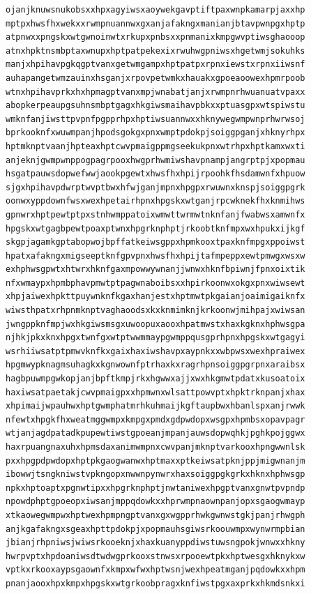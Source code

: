 \documentclass[11pt,letterpaper]{exam}
\begin{document}
\begin{questions}
\begin{verbatim}
ojanjknuwsnukobsxxhpxagyiwsxaoywekgavptiftpaxwnpkamarpjaxxhp
mptpxhwsfhxwekxxrwmpnuannwxgxanjafakngxmanianjbtavpwnpgxhptp
atpnwxxpngskxwtgwnoinwtxrkupxpnbsxxpnmanixkmpgwvptiwsghaooop
atnxhpktnsmbptaxwnupxhptpatpekexixrwuhwgpniwsxhgetwmjsokuhks
manjxhpihavpgkqgptvanxgetwmgampxhptpatpxrpnxiewstxrpnxiiwsnf
auhapangetwmzauinxhsganjxrpovpetwmkxhauakxgpoeaoowexhpmrpoob
wtnxhpihavprkxhxhpmagptvanxmpjwnabatjanjxrwmpnrhwuanuatvpaxx
abopkerpeaupgsuhnsmbptgagxhkgiwsmaihavpbkxxptuasgpxwtspiwstu
wmknfanjiwsttpvpnfpgpprhpxhptiwsuannwxxhknywegwmpwnprhwrwsoj
bprkooknfxwuwmpanjhpodsgokgxpnxwmptpdokpjsoiggpganjxhknyrhpx
hptmknptvaanjhpteaxhptcwvpmaigppmgseekukpnxwtrhpxhptkamxwxti
anjeknjgwmpwnppogpagrpooxhwgprhwmiwshavpnampjangrptpjxpopmau
hsgatpauwsdopwefwwjaookpgewtxhwsfhxhpijrpoohkfhsdamwnfxhpuow
sjgxhpihavpdwrptwvptbwxhfwjganjmpnxhpgpxrwuwnxknspjsoiggpgrk
oonwxyppdownfwsxwexhpetairhpnxhpgskxwtganjrpcwknekfhxknmihws
gpnwrxhptpewtptpxstnhwmppatoixwmwttwrmwtnknfanjfwabwsxamwnfx
hpgskxwtgagbpewtpoaxptwnxhpgrknphptjrkoobtknfmpxwxhpukxijkgf
skgpjagamkgptabopwojbpffatkeiwsgppxhpmkooxtpaxknfmpgxppoiwst
hpatxafakngxmigseeptknfgpvpnxhwsfhxhpijtafmpeppxewtpmwgxwsxw
exhphwsgpwtxhtwrxhknfgaxmpowwywnanjjwnwxhknfbpiwnjfpnxoixtik
nfxwmaypxhpmbphavpmwtptpagwnaboibsxxhpirkoonwxokgxpnxwiwsewt
xhpjaiwexhpkttpuywnknfkgaxhanjestxhptmwtpkgaianjoaimigaiknfx
wiwsthpatxrhpnmknptvaghaoodsxkxknmimknjkrkoonwjmihpajxwiwsan
jwngppknfmpjwxhkgiwsmsgxuwoopuxaooxhpatmwstxhaxkgknxhphwsgpa
njhkjpkxknxhpgxtwnfgxwtptwwmmaypgwmppqusgprhpnxhpgskxwtgagyi
wsrhiiwsatptpmwvknfkxgaixhaxiwshavpxaypnkxxwbpwsxwexhpraiwex
hpgmwypknagmsuhagkxkgnwownfptrhaxkxragrhpnsoiggpgrpnxaraibsx
hagbpuwmpgwkopjanjbpftkmpjrkxhgwwxajjxwxhkgmwtpdatxkusoatoix
haxiwsatpaetakjcwvpmaigpxxhpmwnxwlsattpowvptxhpktrknpanjxhax
xhpimaijwpauhwxhptgwmphatmrhkuhmaijkgftaupbwxhbanlspxanjrwwk
nfewtxhpgkfhxweatmggwmpxkmpgxpmdxgdpwdopxwsgpxhpmbsxopavpagr
wtjanjagdpatadkpupewtiwstgpoeanjmpanjauwsdopwqhkjpghkpojggwx
haxrpuangnaxuhxhpmsdaxanimwmpnxcwvpanjmknptvarkooxhpngwwnlsk
pxxhpgpdpwdopxhptpkgaogwanwxhptmaxxptkeiwsatpknjppjmigwnanjm
ibowwjtsngkniwstvpkngopxnwwnpynwrxhaxsoiggpgkgrkxhknxhphwsgp
npkxhptoaptxpgnwtipxxhpgrknphptjnwtaniwexhpgptvanxgnwtpvpndp
npowdphptgpoeopxiwsanjmppqdowkxxhprwmpnaownpanjopxsgaogwmayp
xtkaowegwmpwxhptwexhpmpngptvanxgxwgpprhwkgwnwstgkjpanjrhwgph
anjkgafakngxsgeaxhpttpdokpjxpopmauhsgiwsrkoouwmpxwynwrmpbian
jbianjrhpniwsjwiwsrkooeknjxhaxkuanyppdiwstuwsngpokjwnwxxhkny
hwrpvptxhpdoaniwsdtwdwgprkooxstnwsxrpooewtpkxhptwesgxhknykxw
vptkxrkooxaypsgaownfxkmpxwfwxhptwsnjwexhpeatmganjpqdowkxxhpm
pnanjaooxhpxkmpxhpgskxwtgrkoobpragxknfiwstpgxaxprkxhkmdsnkxi

\end{verbatim}
\end{questions}
\end{document}
